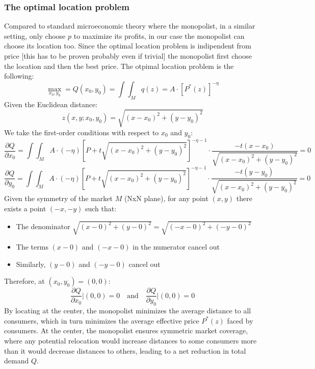 \subsubsection*{The optimal location problem}
Compared to standard microeconomic theory where the monopolist, in a similar setting, only choose $p$ to maximize its profits, in our case the monopolist can choose its location too.
Since the optimal location problem is indipendent from price [this has to be proven probably even if trivial] the monopolist first choose the location and then the best price.
The otpimal location problem is the following:
\begin{equation}
    \max_{x_0,y_0}=Q(x_0,y_0)=\int\int_M q(z)=A \cdot\left[P^*(z)\right]^{-\eta}
\end{equation}
Given the Euclidean distance:
\begin{equation}
z(x,y;x_0,y_0)=\sqrt{(x-x_0)^2+(y-y_0)^2}
\end{equation}
We take the first-order conditions with respect to $x_0$ and $y_0$:
\begin{equation}
\frac{\partial Q}{\partial x_0}=\int\int_M A\cdot(-\eta)\left[P+t\sqrt{(x-x_0)^2+(y-y_0)^2}\right]^{-\eta-1}\cdot\frac{-t(x-x_0)}{\sqrt{(x-x_0)^2+(y-y_0)^2}}=0
\end{equation}
\begin{equation}
\frac{\partial Q}{\partial y_0}=\int\int_M A\cdot(-\eta)\left[P+t\sqrt{(x-x_0)^2+(y-y_0)^2}\right]^{-\eta-1}\cdot\frac{-t(y-y_0)}{\sqrt{(x-x_0)^2+(y-y_0)^2}}=0
\end{equation}
Given the symmetry of the market $M$ (NxN plane), for any point $(x,y)$ there exists a point $(-x,-y)$ such that:
\begin{itemize}
\item The denominator $\sqrt{(x-0)^2+(y-0)^2}=\sqrt{(-x-0)^2+(-y-0)^2}$
\item The terms $(x-0)$ and $(-x-0)$ in the numerator cancel out
\item Similarly, $(y-0)$ and $(-y-0)$ cancel out
\end{itemize}
Therefore, at $(x_0,y_0)=(0,0)$:
\begin{equation}
\frac{\partial Q}{\partial x_0}\bigg|{(0,0)}=0 \quad \text{and} \quad \frac{\partial Q}{\partial y_0}\bigg|{(0,0)}=0
\end{equation}
By locating at the center, the monopolist minimizes the average distance to all consumers, which in turn minimizes the average effective price $P^*(z)$ faced by consumers. At the center, the monopolist ensures symmetric market coverage, where any potential relocation would increase distances to some consumers more than it would decrease distances to others, leading to a net reduction in total demand $Q$.
